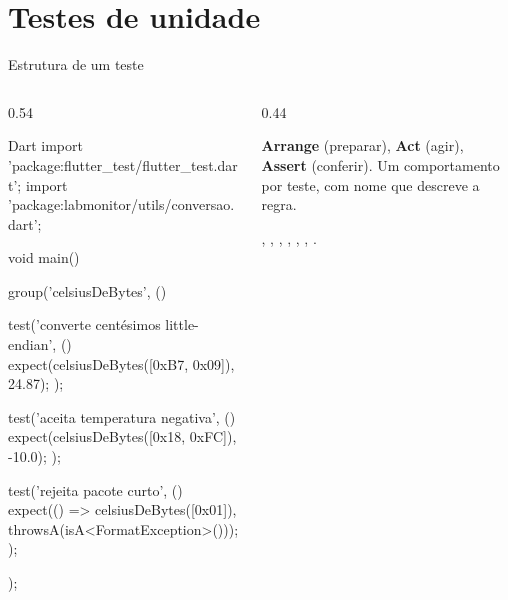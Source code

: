 \documentclass[aspectratio=169,10pt]{beamer}
\begin{document}
\section{Testes de unidade}

\begin{frame}[fragile]{Estrutura de um teste}
  \begin{columns}[T]
    \begin{column}{0.54\textwidth}
\begin{codigo}[title=test/utils/conversao\_test.dart]{Dart}
import 'package:flutter_test/flutter_test.dart';
import 'package:labmonitor/utils/conversao.dart';

void main() {
  group('celsiusDeBytes', () {
    test('converte centésimos little-endian', () {
      expect(celsiusDeBytes([0xB7, 0x09]), 24.87);
    });

    test('aceita temperatura negativa', () {
      expect(celsiusDeBytes([0x18, 0xFC]), -10.0);
    });

    test('rejeita pacote curto', () {
      expect(() => celsiusDeBytes([0x01]),
          throwsA(isA<FormatException>()));
    });
  });
}
\end{codigo}
    \end{column}
    \begin{column}{0.44\textwidth}
      \begin{conceito}
        \textbf{Arrange} (preparar), \textbf{Act} (agir), \textbf{Assert} (conferir). Um comportamento por teste, com nome que descreve a regra.
      \end{conceito}
      \begin{dica}
        , , , , , , .
      \end{dica}
    \end{column}
  \end{columns}
\end{frame}
\end{document}
